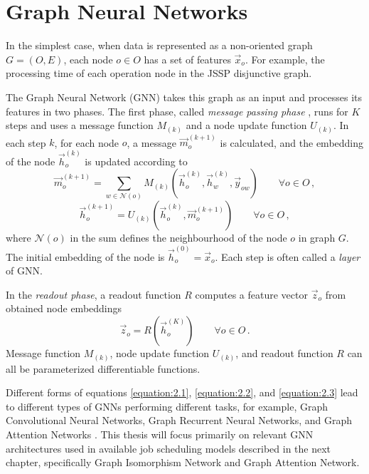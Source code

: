\section{Graph Neural Networks}

In the simplest case, when data is represented as a non-oriented graph $G = (O, E)$, each node $o \in O$ has a set of features $\vec{x}_o$. For example, the processing time of each operation node in the JSSP disjunctive graph. 
\par
The Graph Neural Network (GNN) takes this graph as an input and processes its features in two phases. The first phase, called \textit{message passing phase} \cite{pmlr-v70-gilmer17a}, runs for $K$ steps and uses a message function $M_{(k)}$ and a node update function $U_{(k)}$. In each step $k$, for each node $o$, a message $\vec{m}_o^{(k + 1)}$ is calculated, and the embedding of the node $\vec{h}_o^{(k)}$ is updated according to \cite{pmlr-v70-gilmer17a}
\begin{equation}\label{equation:2.1}
	\vec{m}_o^{(k + 1)} = \sum_{w \in \mathcal{N}(o)} M_{(k)} \left(\vec{h}_o^{(k)}, \vec{h}_w^{(k)}, \vec{y}_{ow} \right) \hspace{2em} \forall o \in O \, ,
\end{equation}
\begin{equation}\label{equation:2.2}
	\vec{h}_o^{(k+1)} = U_{(k)} \left(\vec{h}_o^{(k)}, \vec{m}_o^{(k+1)}\right) \hspace{2em }\forall o \in O \, , 
\end{equation}
where $\mathcal{N}(o)$ in the sum defines the neighbourhood of the node $o$ in graph $G$. The initial embedding of the node is $\vec{h}_o^{(0)} = \vec{x}_o$. Each step is often called a \textit{layer} of GNN.
\par
In the \textit{readout phase}, a readout function $R$ computes a feature vector $\vec{z}_o$ from obtained node embeddings \cite{pmlr-v70-gilmer17a}
\begin{equation}\label{equation:2.3}
	\vec{z}_o = R\left(\vec{h}_o^{(K)}\right) \hspace{2em} \forall o \in O \, .
\end{equation}
Message function $M_{(k)}$, node update function $U_{(k)}$, and readout function $R$ can all be parameterized differentiable functions.
\par
Different forms of equations \ref{equation:2.1}, \ref{equation:2.2}, and \ref{equation:2.3} lead to different types of GNNs performing different tasks, for example, Graph Convolutional Neural Networks, Graph Recurrent Neural Networks, and Graph Attention Networks \cite{sanchez-lengeling2021a, 10.1145/3495161, DBLP:journals/corr/abs-1810-00826}. This thesis will focus primarily on relevant GNN architectures used in available job scheduling models described in the next chapter, specifically Graph Isomorphism Network and Graph Attention Network.

